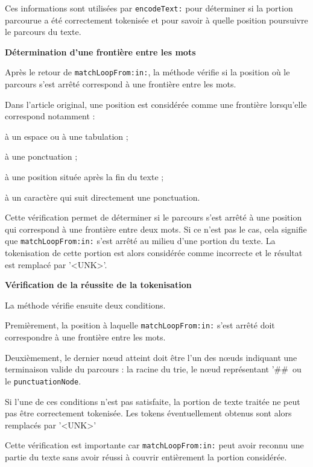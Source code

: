 \documentclass[12pt,a4paper]{report}
\begin{document}
	Ces informations sont utilisées par \texttt{encodeText:} pour déterminer si la portion parcourue a été correctement tokenisée et pour savoir à quelle position poursuivre le parcours du texte.
	
	\textbf{Détermination d'une frontière entre les mots}
	
	Après le retour de \texttt{matchLoopFrom:in:}, la méthode vérifie si la position où le parcours s'est arrêté correspond à une frontière entre les mots.
	
	Dans l'article original, une position est considérée comme une frontière lorsqu'elle correspond notamment :
	
	\begin{itemizeFB}
		\item à un espace ou à une tabulation ;
		\item à une ponctuation ;
		\item à une position située après la fin du texte ;
		\item à un caractère qui suit directement une ponctuation.
	\end{itemizeFB}
	
	Cette vérification permet de déterminer si le parcours s'est arrêté à une position qui correspond à une frontière entre deux mots.
	Si ce n'est pas le cas, cela signifie que \texttt{matchLoopFrom:in:} s'est arrêté au milieu d'une portion du texte. La tokenisation de cette portion est alors considérée comme incorrecte et le résultat est remplacé par '<UNK>'.
	
	\textbf{Vérification de la réussite de la tokenisation}
	
	La méthode vérifie ensuite deux conditions.
	
	Premièrement, la position à laquelle \texttt{matchLoopFrom:in:} s'est arrêté doit correspondre à une frontière entre les mots.
	
	Deuxièmement, le dernier nœud atteint doit être l'un des nœuds indiquant une terminaison valide du parcours : la racine du trie, le nœud représentant '\#\#\ ou le \texttt{punctuationNode}.
	
	Si l'une de ces conditions n'est pas satisfaite, la portion de texte traitée ne peut pas être correctement tokenisée. Les tokens éventuellement obtenus sont alors remplacés par '<UNK>'
	
	Cette vérification est importante car \texttt{matchLoopFrom:in:} peut avoir reconnu une partie du texte sans avoir réussi à couvrir entièrement la portion considérée.
	
\end{document}
